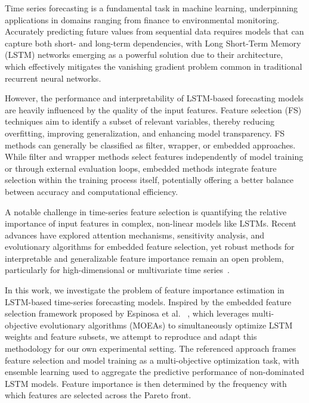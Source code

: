 \documentclass[12pt]{article}
\begin{document}
Time series forecasting is a fundamental task in machine learning, underpinning applications in domains ranging from finance to environmental monitoring. Accurately predicting future values from sequential data requires models that can capture both short- and long-term dependencies, with Long Short-Term Memory (LSTM) networks emerging as a powerful solution due to their architecture, which effectively mitigates the vanishing gradient problem common in traditional recurrent neural networks.

However, the performance and interpretability of LSTM-based forecasting models are heavily influenced by the quality of the input features. Feature selection (FS) techniques aim to identify a subset of relevant variables, thereby reducing overfitting, improving generalization, and enhancing model transparency. FS methods can generally be classified as filter, wrapper, or embedded approaches. ~\cite{espinosa2023embeddedfeatureselectionlstm} While filter and wrapper methods select features independently of model training or through external evaluation loops, embedded methods integrate feature selection within the training process itself, potentially offering a better balance between accuracy and computational efficiency.

A notable challenge in time-series feature selection is quantifying the relative importance of input features in complex, non-linear models like LSTMs. Recent advances have explored attention mechanisms, sensitivity analysis, and evolutionary algorithms for embedded feature selection, yet robust methods for interpretable and generalizable feature importance remain an open problem, particularly for high-dimensional or multivariate time series~\cite{espinosa2023embeddedfeatureselectionlstm}.

In this work, we investigate the problem of feature importance estimation in LSTM-based time-series forecasting models. Inspired by the embedded feature selection framework proposed by Espinosa et al. ~\cite{espinosa2023embeddedfeatureselectionlstm}, which leverages multi-objective evolutionary algorithms (MOEAs) to simultaneously optimize LSTM weights and feature subsets, we attempt to reproduce and adapt this methodology for our own experimental setting. The referenced approach frames feature selection and model training as a multi-objective optimization task, with ensemble learning used to aggregate the predictive performance of non-dominated LSTM models. Feature importance is then determined by the frequency with which features are selected across the Pareto front.
\end{document}

